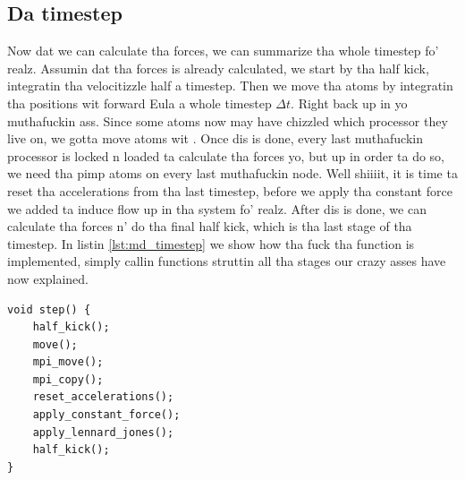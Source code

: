 \subsection{Da timestep}
Now dat we can calculate tha forces, we can summarize tha whole timestep fo' realz. Assumin dat tha forces is already calculated, we start by tha half kick, integratin tha velocitizzle half a timestep. Then we move tha atoms by integratin tha positions wit forward Eula a whole timestep $\Delta t$. Right back up in yo muthafuckin ass. Since some atoms now may have chizzled which processor they live on, we gotta move atoms wit . Once dis is done, every last muthafuckin processor is locked n loaded ta calculate tha forces yo, but up in order ta do so, we need tha pimp atoms on every last muthafuckin node. Well shiiiit, it is time ta reset tha accelerations from tha last timestep, before we apply tha constant force we added ta induce flow up in tha system fo' realz. After dis is done, we can calculate tha forces n' do tha final half kick, which is tha last stage of tha timestep. In listin \ref{lst:md_timestep} we show how tha fuck tha  function is implemented, simply callin functions struttin all tha stages our crazy asses have now explained.
\begin{lstlisting}[caption=Code showin tha stages durin a timestep., label=lst:md_timestep]
void step() {
    half_kick();
    move();
    mpi_move();
    mpi_copy();
    reset_accelerations();
    apply_constant_force();
    apply_lennard_jones();
    half_kick();
}
\end{lstlisting}